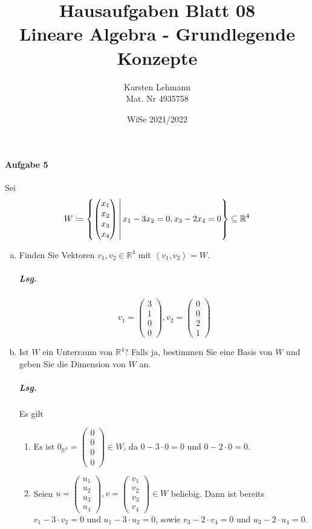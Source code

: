 \documentclass{scrreprt}
\author{Karsten Lehmann\\Mat. Nr 4935758}
\date{WiSe 2021/2022}
\title{Hausaufgaben Blatt 08\\Lineare Algebra - Grundlegende Konzepte}
\newcommand\hull[1]{\left\langle #1 \right\rangle}
\begin{document}
\paragraph{Aufgabe 5} Sei
\[
  W \coloneqq \qty{
    \begin{pmatrix}x_1 \\ x_2 \\ x_3 \\ x_4\end{pmatrix}
    \, \middle| \,
    x_1 - 3x_2 = 0, x_3 - 2x_4 = 0
  } \subseteq \mathbb{R}^4
\]
\begin{enumerate}[(a)]
\item Finden Sie Vektoren $v_1, v_2 \in \mathbb{R}^4$ mit $\hull{v_1, v_2} = W$.
  \subparagraph{Lsg.}
  \[
    v_1 = \begin{pmatrix}3 \\ 1 \\ 0 \\ 0\end{pmatrix},
    v_2 = \begin{pmatrix}0 \\ 0 \\ 2 \\ 1\end{pmatrix}
  \]
\item Ist $W$ ein Unterraum von $\mathbb{R}^4$?
  Falls ja, bestimmen Sie eine Basis von $W$ und geben Sie die Dimension von
  $W$ an.

  \subparagraph{Lsg.} Es gilt
  \begin{enumerate}[(1)]
  \item Es ist
    $0_{\mathbb{R}^4} = \begin{pmatrix}0 \\ 0 \\ 0 \\ 0\end{pmatrix} \in W$,
    da $0 - 3 \cdot 0 = 0$ und $0 - 2 \cdot 0 = 0$.

  \item Seien $u = \begin{pmatrix}u_1 \\ u_2 \\ u_3 \\ u_4\end{pmatrix},
    v = \begin{pmatrix}v_1 \\ v_2 \\ v_3 \\ v_4\end{pmatrix} \in W$ beliebig.
    Dann ist bereits $v_1 - 3 \cdot v_2 = 0$ und $u_1 - 3 \cdot u_2 = 0$, sowie
    $v_3 - 2 \cdot v_4 = 0$ und $u_3 - 2 \cdot u_4 = 0$.


\end{enumerate}
\end{enumerate}
\end{document}
